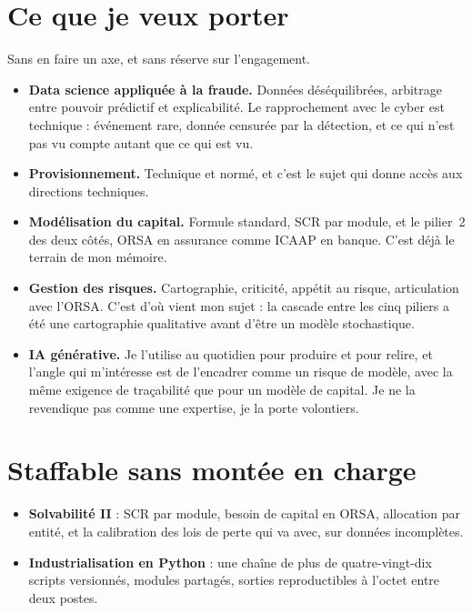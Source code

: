 \documentclass[11pt,a4paper]{article}
\begin{document}
\section{Ce que je veux porter}

\noindent Sans en faire un axe, et sans réserve sur l'engagement.

\begin{itemize}
\item \textbf{Data science appliquée à la fraude.} Données déséquilibrées, arbitrage entre
      pouvoir prédictif et explicabilité. Le rapprochement avec le cyber est technique :
      événement rare, donnée censurée par la détection, et ce qui n'est pas vu compte autant
      que ce qui est vu.
\item \textbf{Provisionnement.} Technique et normé, et c'est le sujet qui donne accès aux
      directions techniques.
\item \textbf{Modélisation du capital.} Formule standard, SCR par module, et le pilier~2 des
      deux côtés, ORSA en assurance comme ICAAP en banque. C'est déjà le terrain de mon
      mémoire.
\item \textbf{Gestion des risques.} Cartographie, criticité, appétit au risque, articulation
      avec l'ORSA. C'est d'où vient mon sujet : la cascade entre les cinq piliers a été une
      cartographie qualitative avant d'être un modèle stochastique.
\item \textbf{IA générative.} Je l'utilise au quotidien pour produire et pour relire, et
      l'angle qui m'intéresse est de l'encadrer comme un risque de modèle, avec la même
      exigence de traçabilité que pour un modèle de capital. Je ne la revendique pas comme
      une expertise, je la porte volontiers.
\end{itemize}

\section{Staffable sans montée en charge}

\begin{itemize}
\item \textbf{Solvabilité II} : SCR par module, besoin de capital en ORSA, allocation par
      entité, et la calibration des lois de perte qui va avec, sur données incomplètes.
\item \textbf{Industrialisation en Python} : une chaîne de plus de quatre-vingt-dix scripts
      versionnés, modules partagés, sorties reproductibles à l'octet entre deux postes.
\end{itemize}
\end{document}
